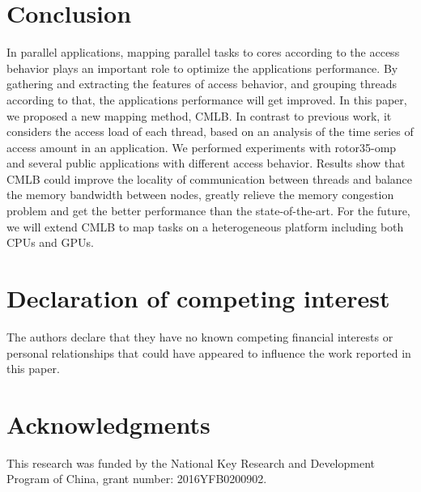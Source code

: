 \documentclass[a4paper,fleqn]{cas-sc}
\begin{document}
\section{Conclusion} \label{sect5}
In parallel applications, mapping parallel tasks to cores according to the access behavior plays an important role to optimize the applications performance. By gathering and extracting the features of access behavior, and grouping threads according to that, the applications performance will get improved. 
In this paper, we proposed a new mapping method, CMLB. In contrast to previous work, it considers the access load of each thread, based on an analysis of the time series of access amount in an application. We performed experiments with rotor35-omp and several public applications with different access behavior. Results show that CMLB could improve the locality of communication between threads and balance the memory bandwidth between nodes, greatly relieve the memory congestion problem and get the better performance than the state-of-the-art. 
For the future, we will extend CMLB to map tasks on a heterogeneous platform including both CPUs and GPUs.
\section{Declaration of competing interest}
The authors declare that they have no known competing financial interests or personal relationships that could have appeared to influence the work reported in this paper.

\section{Acknowledgments}
This research was funded by the National Key Research and Development Program of China, grant number: 2016YFB0200902.






\makeatletter
\renewcommand{\@biblabel}[1]{[#1]}
\makeatother
\end{document}
